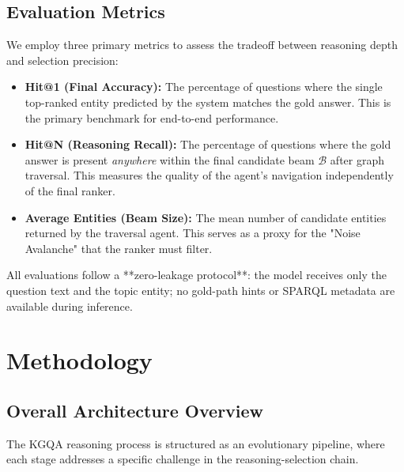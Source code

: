 \documentclass[11pt,a4paper]{article}
\begin{document}
\subsection{Evaluation Metrics}
We employ three primary metrics to assess the tradeoff between reasoning
depth and selection precision:
\begin{itemize}
    \item \textbf{Hit@1 (Final Accuracy):} The percentage of questions where the
          single top-ranked entity predicted by the system matches the gold
          answer. This is the primary benchmark for end-to-end performance.
    \item \textbf{Hit@N (Reasoning Recall):} The percentage of questions where the
          gold answer is present \emph{anywhere} within the final candidate
          beam $\mathcal{B}$ after graph traversal. This measures the quality of
          the agent's navigation independently of the final ranker.
    \item \textbf{Average Entities (Beam Size):} The mean number of candidate
          entities returned by the traversal agent. This serves as a proxy for
          the "Noise Avalanche" that the ranker must filter.
\end{itemize}
All evaluations follow a **zero-leakage protocol**: the model receives only
the question text and the topic entity; no gold-path hints or SPARQL metadata
are available during inference.


\section{Methodology}
\label{sec:method}

\subsection{Overall Architecture Overview}

The KGQA reasoning process is structured as an evolutionary pipeline, where each stage addresses a specific challenge in the reasoning-selection chain.
\end{document}
